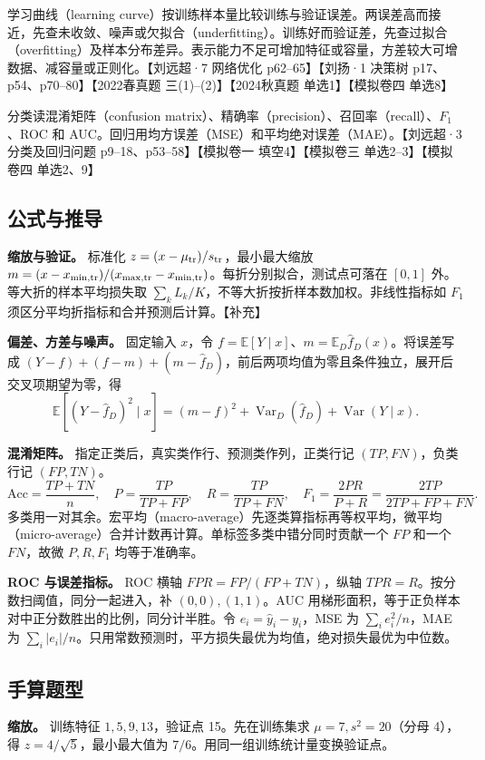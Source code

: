 \documentclass[UTF8,a4paper,zihao=-4,fontset=fandol]{ctexart}
\begin{document}
学习曲线（learning curve）按训练样本量比较训练与验证误差。两误差高而接近，先查未收敛、噪声或欠拟合（underfitting）。训练好而验证差，先查过拟合（overfitting）及样本分布差异。表示能力不足可增加特征或容量，方差较大可增数据、减容量或正则化。【刘远超·7 网络优化 p62--65】【刘扬·1 决策树 p17、p54、p70--80】【2022春真题 三(1)--(2)】【2024秋真题 单选1】【模拟卷四 单选8】
 
分类读混淆矩阵（confusion matrix）、精确率（precision）、召回率（recall）、\(F_1\)、ROC 和 AUC。回归用均方误差（MSE）和平均绝对误差（MAE）。【刘远超·3 分类及回归问题 p9--18、p53--58】【模拟卷一 填空4】【模拟卷三 单选2--3】【模拟卷四 单选2、9】

\subsection{公式与推导}
\textbf{缩放与验证。} 标准化 \(z=(x-\mu_{\rm tr})/s_{\rm tr}\)，最小最大缩放 \(m=(x-x_{\min,\rm tr})/(x_{\max,\rm tr}-x_{\min,\rm tr})\)。每折分别拟合，测试点可落在 \([0,1]\) 外。等大折的样本平均损失取 \(\sum_k L_k/K\)，不等大折按折样本数加权。非线性指标如 \(F_1\) 须区分平均折指标和合并预测后计算。【补充】
 
\textbf{偏差、方差与噪声。} 固定输入 \(x\)，令 \(f=\mathbb E[Y\mid x]\)、\(m=\mathbb E_D\hat f_D(x)\)。将误差写成 \((Y-f)+(f-m)+(m-\hat f_D)\)，前后两项均值为零且条件独立，展开后交叉项期望为零，得
\[
 \mathbb E[(Y-\hat f_D)^2\mid x]=(m-f)^2+\operatorname{Var}_D(\hat f_D)+\operatorname{Var}(Y\mid x).
\]
 
\textbf{混淆矩阵。} 指定正类后，真实类作行、预测类作列，正类行记 \((TP,FN)\)，负类行记 \((FP,TN)\)。
\[
 \mathrm{Acc}=\frac{TP+TN}{n},\quad P=\frac{TP}{TP+FP},\quad R=\frac{TP}{TP+FN},
 \quad F_1=\frac{2PR}{P+R}=\frac{2TP}{2TP+FP+FN}.
\]
多类用一对其余。宏平均（macro-average）先逐类算指标再等权平均，微平均（micro-average）合并计数再计算。单标签多类中错分同时贡献一个 \(FP\) 和一个 \(FN\)，故微 \(P,R,F_1\) 均等于准确率。
 
\textbf{ROC 与误差指标。} ROC 横轴 \(FPR=FP/(FP+TN)\)，纵轴 \(TPR=R\)。按分数扫阈值，同分一起进入，补 \((0,0),(1,1)\)。AUC 用梯形面积，等于正负样本对中正分数胜出的比例，同分计半胜。令 \(e_i=\hat y_i-y_i\)，MSE 为 \(\sum_i e_i^2/n\)，MAE 为 \(\sum_i|e_i|/n\)。只用常数预测时，平方损失最优为均值，绝对损失最优为中位数。

\subsection{手算题型}
\textbf{缩放。} 训练特征 \(1,5,9,13\)，验证点 15。先在训练集求 \(\mu=7,s^2=20\)（分母 4），得 \(z=4/\sqrt5\)，最小最大值为 \(7/6\)。用同一组训练统计量变换验证点。
 
\end{document}
